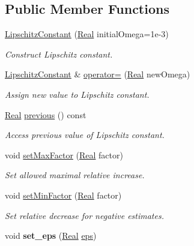 \subsection*{Public Member Functions}
\begin{DoxyCompactItemize}
\item 
\hyperlink{classSpacy_1_1LipschitzConstant_aa260cc7420e3f5cfc7fe2d78fb2aa7ad}{Lipschitz\-Constant} (\hyperlink{classSpacy_1_1Real}{Real} initial\-Omega=1e-\/3)
\begin{DoxyCompactList}\small\item\em Construct Lipschitz constant. \end{DoxyCompactList}\item 
\hyperlink{classSpacy_1_1LipschitzConstant}{Lipschitz\-Constant} \& \hyperlink{classSpacy_1_1LipschitzConstant_a7f5636d01898427c65555da9b55450dd}{operator=} (\hyperlink{classSpacy_1_1Real}{Real} new\-Omega)
\begin{DoxyCompactList}\small\item\em Assign new value to Lipschitz constant. \end{DoxyCompactList}\item 
\hyperlink{classSpacy_1_1Real}{Real} \hyperlink{classSpacy_1_1LipschitzConstant_a3a91ae4dea16ff7e83f1d51797145cbd}{previous} () const 
\begin{DoxyCompactList}\small\item\em Access previous value of Lipschitz constant. \end{DoxyCompactList}\item 
void \hyperlink{classSpacy_1_1LipschitzConstant_a5e4f00a4178814300de3f2a0ac391c1c}{set\-Max\-Factor} (\hyperlink{classSpacy_1_1Real}{Real} factor)
\begin{DoxyCompactList}\small\item\em Set allowed maximal relative increase. \end{DoxyCompactList}\item 
void \hyperlink{classSpacy_1_1LipschitzConstant_ac5dbb64f6535fe26b6f5e43c95d85282}{set\-Min\-Factor} (\hyperlink{classSpacy_1_1Real}{Real} factor)
\begin{DoxyCompactList}\small\item\em Set relative decrease for negative estimates. \end{DoxyCompactList}\item 
\hypertarget{classSpacy_1_1Mixin_1_1Eps_a818ab6dfab5e4eea583e1302bcc621f8}{void {\bfseries set\-\_\-eps} (\hyperlink{classSpacy_1_1Real}{Real} \hyperlink{classSpacy_1_1Mixin_1_1Eps_a812b99b0abc1d78a34b4114907f23f52}{eps})}\label{classSpacy_1_1Mixin_1_1Eps_a818ab6dfab5e4eea583e1302bcc621f8}


\end{DoxyCompactItemize}

